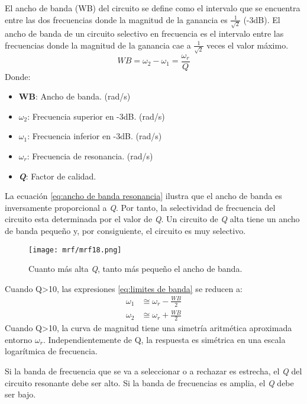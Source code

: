 \documentclass[
	12pt, %
	fleqn, %
	a4paper, %
	oneside, %
]{LegrandOrangeBook}
\begin{document}
\begin{definition}
El ancho de banda (WB) del circuito se define como el intervalo que se encuentra entre las dos frecuencias donde la magnitud de la ganancia es $\frac{1}{\sqrt{2}}$ (-3dB). El ancho de banda de un circuito selectivo en frecuencia es el intervalo entre las frecuencias donde la magnitud de la ganancia cae a $\frac{1}{\sqrt{2}}$ veces el valor máximo.
\begin{equation}
WB=\omega_2-\omega_1=\frac{\omega_r}{Q}
\label{eq:ancho de banda resonancia}
\end{equation}
Donde:
\begin{itemize}
\item \textbf{WB}: Ancho de banda. (rad/s)
\item $\omega_2$: Frecuencia superior en -3dB. (rad/s)
\item $\omega_1$: Frecuencia inferior en -3dB. (rad/s)
\item $\omega_r$: Frecuencia de resonancia. (rad/s)
\item \textbf{\textit{Q}}: Factor de calidad.
\end{itemize}
\end{definition}
La ecuación \ref{eq:ancho de banda resonancia} ilustra que el ancho de banda es inversamente proporcional a \textit{Q}. Por tanto, la selectividad de frecuencia del circuito esta determinada por el valor de \textit{Q}. Un circuito de \textit{Q} alta tiene un ancho de banda pequeño y, por consiguiente, el circuito es muy selectivo.
\begin{figure}[H]
\centering
\texttt{[image: mrf/mrf18.png]}
\caption{Cuanto más alta \textit{Q}, tanto más pequeño el ancho de banda.}
\end{figure}
Cuando Q>10, las expresiones \ref{eq:limites de banda} se reducen a:
\begin{align}
\omega_1&\cong\omega_r-\frac{WB}{2}\\
\omega_2&\cong\omega_r+\frac{WB}{2}
\end{align}
Cuando Q>10, la curva de magnitud tiene una simetría aritmética aproximada entorno $\omega_r$. Independientemente de Q, la respuesta es simétrica en una escala logarítmica de frecuencia.
\begin{remark}
Si la banda de frecuencia que se va a seleccionar o a rechazar es estrecha, el \textit{Q} del circuito resonante debe ser alto. Si la banda de frecuencias es amplia, el \textit{Q} debe ser bajo.
\end{remark}
\end{document}
